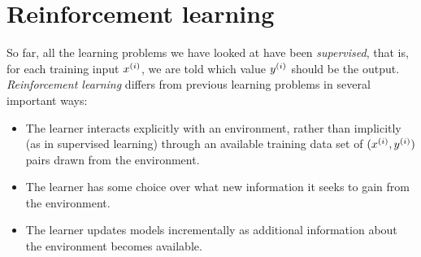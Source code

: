 \chapter{Reinforcement learning}
\label{chap-reinforcement}

So far, all the learning problems we have looked at have been {\em supervised}, that is, for each training input $x^{(i)}$, we
are told which value $y^{(i)}$ should be the output. {\em Reinforcement learning} differs from previous learning problems in several important ways:


\begin{itemize}
  \item The learner interacts explicitly with an environment, rather
        than implicitly (as in supervised learning) through an available
        training data set of $(x^{(i)}, y^{(i)})$ pairs drawn from the
        environment.
  \item The learner has some choice over what new information it
        seeks to gain from the environment.
  \item The learner updates models incrementally  as additional information about the
        environment becomes available.
\end{itemize}

